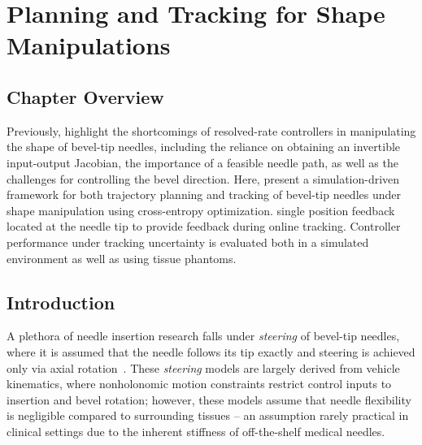 \chapter{Planning and Tracking for Shape Manipulations} \label{chap:chap-5}

\section{Chapter Overview}
\label{sec:chap-5-overview}

Previously,  highlight the shortcomings of resolved-rate controllers in manipulating the shape of bevel-tip needles, including the reliance on obtaining an invertible input-output Jacobian, the importance of a feasible needle path, as well as the challenges for controlling the bevel direction. Here,  present a simulation-driven framework for both trajectory planning and tracking of bevel-tip needles under shape manipulation using cross-entropy optimization.  single position feedback located at the needle tip to provide feedback during online tracking. Controller performance under tracking uncertainty is evaluated both in a simulated environment as well as using tissue phantoms.

\section{Introduction}
\label{sec:chap-5-introduction}

A plethora of needle insertion research falls under \textit{steering} of bevel-tip needles, where it is assumed that the needle follows its tip exactly and steering is achieved only via axial rotation~\parencite{liReviewTechniquesUsed2022}. These \textit{steering} models are largely derived from vehicle kinematics, where nonholonomic motion constraints restrict control inputs to insertion and bevel rotation; however, these models assume that needle flexibility is negligible compared to surrounding tissues -- an assumption rarely practical in clinical settings due to the inherent stiffness of off-the-shelf medical needles.

